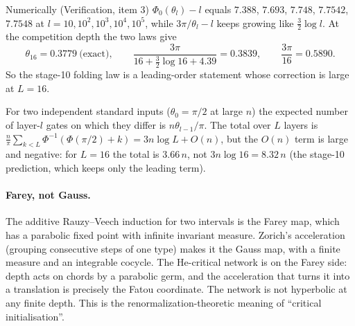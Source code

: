 Numerically (Verification, item 3) $\Phi_0(\theta_l)-l$ equals $7.388$, $7.693$, $7.748$, $7.7542$, $7.7548$ at
$l=10,10^2,10^3,10^4,10^5$, while $3\pi/\theta_l-l$ keeps growing like $\tfrac32\log l$. At the competition depth the two laws give
\[
\theta_{16}=0.3779\ \text{(exact)},\qquad \frac{3\pi}{16+\frac32\log16+4.39}=0.3839,\qquad \frac{3\pi}{16}=0.5890 .
\]
So the stage-10 folding law is a leading-order statement whose correction is large at $L=16$.

\begin{corollary}\label{cor:gates}
For two independent standard inputs ($\theta_0=\pi/2$ at large $n$) the expected number of layer-$l$ gates on which they differ is
$n\theta_{l-1}/\pi$. The total over $L$ layers is $\frac n\pi\sum_{k<L}\Phi^{-1}(\Phi(\pi/2)+k)=3n\log L+O(n)$, but the $O(n)$ term is large
and negative: for $L=16$ the total is $3.66\,n$, not $3n\log16=8.32\,n$ (the stage-10 prediction, which keeps only the leading term).
\end{corollary}

\paragraph{Farey, not Gauss.} The additive Rauzy--Veech induction for two intervals is the Farey map, which has a parabolic fixed point
with infinite invariant measure. Zorich's acceleration (grouping consecutive steps of one type) makes it the Gauss map, with a finite
measure and an integrable cocycle. The He-critical network is on the Farey side: depth acts on chords by a parabolic germ, and the
acceleration that turns it into a translation is precisely the Fatou coordinate. The network is not hyperbolic at any finite depth.
This is the renormalization-theoretic meaning of ``critical initialisation''.


